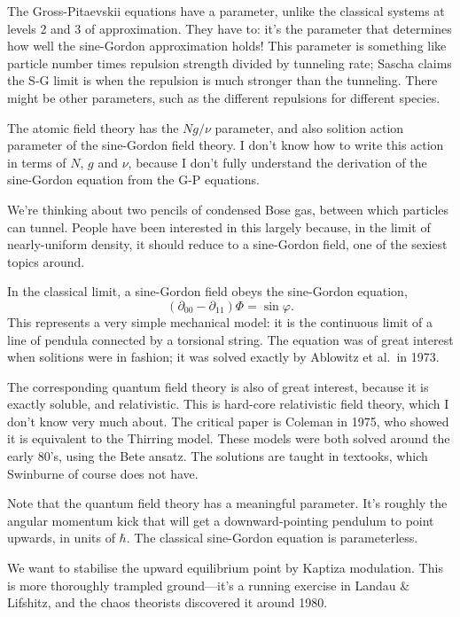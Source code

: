 The Gross-Pitaevskii equations have a parameter, unlike the classical systems at levels 2 and 3 of approximation.  They have to: it's the parameter that determines how well the sine-Gordon approximation holds!  This parameter is something like particle number times repulsion strength divided by tunneling rate; Sascha claims the S-G limit is when the repulsion is much stronger than the tunneling.  There might be other parameters, such as the different repulsions for different species.

The atomic field theory has the $Ng/ν$ parameter, and also solition action parameter of the sine-Gordon field theory.  I don't know how to write this action in terms of $N$, $g$ and $ν$, because I don't fully understand the derivation of the sine-Gordon equation from the G-P equations.



We're thinking about two pencils of condensed Bose gas, between which particles can tunnel.  People have been interested in this largely because, in the limit of nearly-uniform density, it should reduce to a sine-Gordon field, one of the sexiest topics around.

In the classical limit, a sine-Gordon field obeys the sine-Gordon equation, $$(∂_{00}-∂_{11})Φ=\sin φ.$$  This represents a very simple mechanical model: it is the continuous limit of a line of pendula connected by a torsional string.  The equation was of great interest when solitions were in fashion; it was solved exactly by Ablowitz et al.\ in 1973.

The corresponding quantum field theory is also of great interest, because it is exactly soluble, and relativistic.  This is hard-core relativistic field theory, which I don't know very much about.  The critical paper is Coleman in 1975, who showed it is equivalent to the Thirring model.  These models were both solved around the early 80's, using the Bete ansatz.  The solutions are taught in textooks, which Swinburne of course does not have.

Note that the quantum field theory has a meaningful parameter.  It's roughly the angular momentum kick that will get a downward-pointing pendulum to point upwards, in units of $\hbar$.  The classical sine-Gordon equation is parameterless.

We want to stabilise the upward equilibrium point by Kaptiza modulation.  This is more thoroughly trampled ground—it's a running exercise in Landau \& Lifshitz, and the chaos theorists discovered it around 1980.

